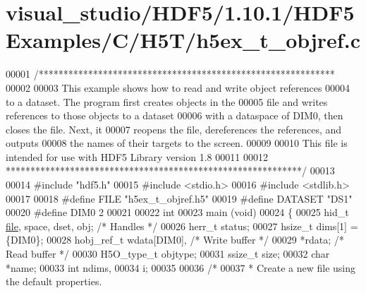 \hypertarget{visual__studio_2_h_d_f5_21_810_81_2_h_d_f5_examples_2_c_2_h5_t_2h5ex__t__objref_8c_source}{}\section{visual\+\_\+studio/\+H\+D\+F5/1.10.1/\+H\+D\+F5\+Examples/\+C/\+H5\+T/h5ex\+\_\+t\+\_\+objref.c}
\label{visual__studio_2_h_d_f5_21_810_81_2_h_d_f5_examples_2_c_2_h5_t_2h5ex__t__objref_8c_source}

\begin{DoxyCode}
00001 \textcolor{comment}{/************************************************************}
00002 \textcolor{comment}{}
00003 \textcolor{comment}{  This example shows how to read and write object references}
00004 \textcolor{comment}{  to a dataset.  The program first creates objects in the}
00005 \textcolor{comment}{  file and writes references to those objects to a dataset}
00006 \textcolor{comment}{  with a dataspace of DIM0, then closes the file.  Next, it}
00007 \textcolor{comment}{  reopens the file, dereferences the references, and outputs}
00008 \textcolor{comment}{  the names of their targets to the screen.}
00009 \textcolor{comment}{}
00010 \textcolor{comment}{  This file is intended for use with HDF5 Library version 1.8}
00011 \textcolor{comment}{}
00012 \textcolor{comment}{ ************************************************************/}
00013 
00014 \textcolor{preprocessor}{#include "hdf5.h"}
00015 \textcolor{preprocessor}{#include <stdio.h>}
00016 \textcolor{preprocessor}{#include <stdlib.h>}
00017 
00018 \textcolor{preprocessor}{#define FILE            "h5ex\_t\_objref.h5"}
00019 \textcolor{preprocessor}{#define DATASET         "DS1"}
00020 \textcolor{preprocessor}{#define DIM0            2}
00021 
00022 \textcolor{keywordtype}{int}
00023 main (\textcolor{keywordtype}{void})
00024 \{
00025     hid\_t       \hyperlink{structfile}{file}, space, dset, obj;     \textcolor{comment}{/* Handles */}
00026     herr\_t      status;
00027     hsize\_t     dims[1] = \{DIM0\};
00028     hobj\_ref\_t  wdata[DIM0],                \textcolor{comment}{/* Write buffer */}
00029                 *rdata;                     \textcolor{comment}{/* Read buffer */}
00030     H5O\_type\_t  objtype;
00031     ssize\_t     size;
00032     \textcolor{keywordtype}{char}        *name;
00033     \textcolor{keywordtype}{int}         ndims,
00034                 i;
00035 
00036     \textcolor{comment}{/*}
00037 \textcolor{comment}{     * Create a new file using the default properties.}

\end{DoxyCode}
